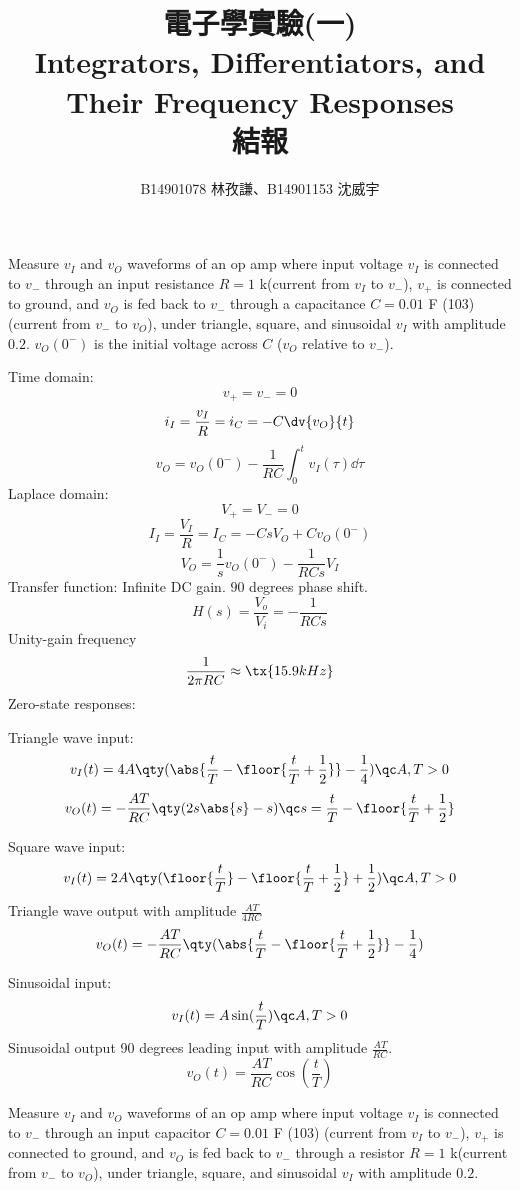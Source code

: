 \documentclass[a4paper,12pt]{article}
\begin{document}
\title{電子學實驗(一)\\Integrators, Differentiators, and Their Frequency Responses\\結報}
\author{B14901078 林孜謙、B14901153 沈威宇}
\date{}
\titledoc
{}
Measure $v_I$ and $v_O$ waveforms of an op amp where input voltage $v_I$ is connected to $v_-$ through an input resistance $R=1$ k\textOmega (current from $v_I$ to $v_-$), $v_+$ is connected to ground, and $v_O$ is fed back to $v_-$ through a capacitance $C=0.01$ \textmu{}F (103) (current from $v_-$ to $v_O$), under triangle, square, and sinusoidal $v_I$ with amplitude $0.2$.
$v_O(0^-)$ is the initial voltage across $C$ ($v_O$ relative to $v_-$).

Time domain:
\[v_+=v_-=0\]
\[i_I=\frac{v_I}{R}=i_C=-C\dv{v_O}{t}\]
\[v_O=v_O(0^-)-\frac{1}{RC}\int_0^tv_I(\tau)\dd{\tau}\]
Laplace domain:
\[V_+=V_-=0\]
\[I_I=\frac{V_I}{R}=I_C=-CsV_O+Cv_O(0^-)\]
\[V_O=\frac{1}{s}v_O(0^-)-\frac{1}{RCs}V_I\]
Transfer function: Infinite DC gain. $90$ degrees phase shift.
\[H(s)=\frac{V_o}{V_i}=-\frac{1}{RCs}\]
Unity-gain frequency
\[\frac{1}{2\pi RC}\approx\tx{15.9 kHz}\]
Zero-state responses:
\bit
\item Triangle wave input:
\[v_I(t)=4A\qty(\abs{\frac{t}{T}-\floor{\frac{t}{T}+\frac{1}{2}}}-\frac{1}{4})\qc A,T>0\]
\[v_O(t)=-\frac{AT}{RC}\qty(2s\abs{s}-s)\qc s=\frac{t}{T}-\floor{\frac{t}{T}+\frac{1}{2}}\]
\item Square wave input:
\[v_I(t)=2A\qty(\floor{\frac{t}{T}}-\floor{\frac{t}{T}+\frac{1}{2}}+\frac{1}{2})\qc A,T>0\]
Triangle wave output with amplitude $\frac{AT}{4RC}$
\[v_O(t)=-\frac{AT}{RC}\qty(\abs{\frac{t}{T}-\floor{\frac{t}{T}+\frac{1}{2}}}-\frac{1}{4})\]
\item Sinusoidal input:
\[v_I(t)=A\sin(\frac{t}{T})\qc A,T>0\]
Sinusoidal output 90 degrees leading input with amplitude $\frac{AT}{RC}$.
\[v_O(t)=\frac{AT}{RC}\cos(\frac{t}{T})\]
\eit
{}



Measure $v_I$ and $v_O$ waveforms of an op amp where input voltage $v_I$ is connected to $v_-$ through an input capacitor $C=0.01$ \textmu{}F (103) (current from $v_I$ to $v_-$), $v_+$ is connected to ground, and $v_O$ is fed back to $v_-$ through a resistor $R=1$ k\textOmega (current from $v_-$ to $v_O$), under triangle, square, and sinusoidal $v_I$ with amplitude $0.2$.
\end{document}
